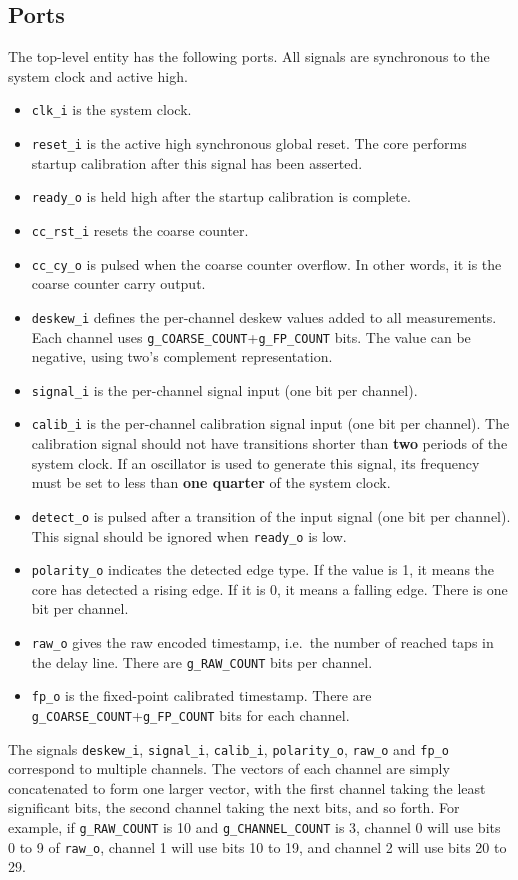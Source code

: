 \documentclass[a4paper,11pt]{article}
\begin{document}
\subsection{Ports}
The top-level entity has the following ports. All signals are synchronous to the system clock and active high.
\begin{itemize}
\item \verb!clk_i! is the system clock.
\item \verb!reset_i! is the active high synchronous global reset. The core performs startup calibration after this signal has been asserted.
\item \verb!ready_o! is held high after the startup calibration is complete.
\item \verb!cc_rst_i! resets the coarse counter.
\item \verb!cc_cy_o! is pulsed when the coarse counter overflow. In other words, it is the coarse counter carry output.
\item \verb!deskew_i! defines the per-channel deskew values added to all measurements. Each channel uses \verb!g_COARSE_COUNT!+\verb!g_FP_COUNT! bits. The value can be negative, using two's complement representation.
\item \verb!signal_i! is the per-channel signal input (one bit per channel).
\item \verb!calib_i! is the per-channel calibration signal input (one bit per channel). The calibration signal should not have transitions shorter than \textbf{two} periods of the system clock. If an oscillator is used to generate this signal, its frequency must be set to less than \textbf{one quarter} of the system clock.
\item \verb!detect_o! is pulsed after a transition of the input signal (one bit per channel). This signal should be ignored when \verb!ready_o! is low.
\item \verb!polarity_o! indicates the detected edge type. If the value is 1, it means the core has detected a rising edge. If it is 0, it means a falling edge. There is one bit per channel.
\item \verb!raw_o! gives the raw encoded timestamp, i.e.\ the number of reached taps in the delay line. There are \verb!g_RAW_COUNT! bits per channel.
\item \verb!fp_o! is the fixed-point calibrated timestamp. There are \verb!g_COARSE_COUNT!+\verb!g_FP_COUNT! bits for each channel.
\end{itemize}

The signals \verb!deskew_i!, \verb!signal_i!, \verb!calib_i!, \verb!polarity_o!, \verb!raw_o! and \verb!fp_o! correspond to multiple channels. The vectors of each channel are simply concatenated to form one larger vector, with the first channel taking the least significant bits, the second channel taking the next bits, and so forth. For example, if \verb!g_RAW_COUNT! is 10 and \verb!g_CHANNEL_COUNT! is 3, channel 0 will use bits 0 to 9 of \verb!raw_o!, channel 1 will use bits 10 to 19, and channel 2 will use bits 20 to 29.
\end{document}
